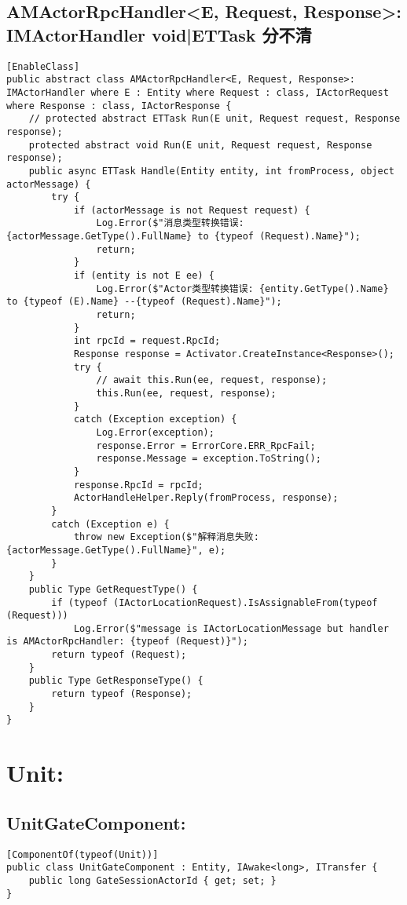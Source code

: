 \documentclass[9pt, b5paper]{article}
\begin{document}
\subsection{AMActorRpcHandler<E, Request, Response>: IMActorHandler void|ETTask 分不清}
\label{sec-7-3}
\begin{verbatim}
[EnableClass]
public abstract class AMActorRpcHandler<E, Request, Response>: IMActorHandler where E : Entity where Request : class, IActorRequest where Response : class, IActorResponse {
    // protected abstract ETTask Run(E unit, Request request, Response response);
    protected abstract void Run(E unit, Request request, Response response);
    public async ETTask Handle(Entity entity, int fromProcess, object actorMessage) {
        try {
            if (actorMessage is not Request request) {
                Log.Error($"消息类型转换错误: {actorMessage.GetType().FullName} to {typeof (Request).Name}");
                return;
            }
            if (entity is not E ee) {
                Log.Error($"Actor类型转换错误: {entity.GetType().Name} to {typeof (E).Name} --{typeof (Request).Name}");
                return;
            }
            int rpcId = request.RpcId;
            Response response = Activator.CreateInstance<Response>();
            try {
                // await this.Run(ee, request, response);
                this.Run(ee, request, response);
            }
            catch (Exception exception) {
                Log.Error(exception);
                response.Error = ErrorCore.ERR_RpcFail;
                response.Message = exception.ToString();
            }
            response.RpcId = rpcId;
            ActorHandleHelper.Reply(fromProcess, response);
        }
        catch (Exception e) {
            throw new Exception($"解释消息失败: {actorMessage.GetType().FullName}", e);
        }
    }
    public Type GetRequestType() {
        if (typeof (IActorLocationRequest).IsAssignableFrom(typeof (Request)))
            Log.Error($"message is IActorLocationMessage but handler is AMActorRpcHandler: {typeof (Request)}");
        return typeof (Request);
    }
    public Type GetResponseType() {
        return typeof (Response);
    }
}
\end{verbatim}
\section{Unit:}
\label{sec-8}
\subsection{UnitGateComponent:}
\label{sec-8-1}
\begin{verbatim}
[ComponentOf(typeof(Unit))]
public class UnitGateComponent : Entity, IAwake<long>, ITransfer {
    public long GateSessionActorId { get; set; }
}
\end{verbatim}
\end{document}
